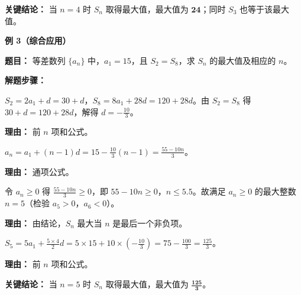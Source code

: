 \begin{examplebox}
	\textbf{\textcolor{CExample}{关键结论：}}
	当 $n=4$ 时 $S_n$ 取得最大值，最大值为 $\boldsymbol{24}$；同时 $S_3$ 也等于该最大值。

	\medskip
	\textbf{\textcolor{CExample}{例 3（综合应用）}}

	\textbf{\textcolor{CExample}{题目：}}
	等差数列 $\{a_n\}$ 中，$a_1=15$，且 $S_2=S_8$，求 $S_n$ 的最大值及相应的 $n$。

	\textbf{\textcolor{CExample}{解题步骤：}}
	\begin{description}[style=nextline, leftmargin=2.8em, labelsep=0.5em, itemsep=0.45em]
		\item[\textbf{第一步（由条件求公差）：}] $S_2=2a_1+d=30+d$，$S_8=8a_1+28d=120+28d$。由 $S_2=S_8$ 得 $30+d=120+28d$，解得 $d=-\frac{10}{3}$。
			\par\textbf{理由：}
			前 $n$ 项和公式。
		\item[\textbf{第二步（求通项）：}] $a_n = a_1+(n-1)d = 15 - \frac{10}{3}(n-1) = \frac{55-10n}{3}$。
			\par\textbf{理由：}
			通项公式。
		\item[\textbf{第三步（确定 $n$）：}] 令 $a_n\ge 0$ 得 $\frac{55-10n}{3}\ge 0$，即 $55-10n\ge 0$，$n\le 5.5$。故满足 $a_n\ge 0$ 的最大整数 $n=5$（检验 $a_5>0$，$a_6<0$）。
			\par\textbf{理由：}
			由结论，$S_n$ 最大当 $n$ 是最后一个非负项。
		\item[\textbf{第四步（求最大值）：}] $S_5 = 5a_1 + \frac{5\times 4}{2}d = 5\times 15 + 10\times \left(-\frac{10}{3}\right) = 75 - \frac{100}{3} = \frac{125}{3}$。
			\par\textbf{理由：}
			前 $n$ 项和公式。
	\end{description}

	\textbf{\textcolor{CExample}{关键结论：}}
	当 $n=5$ 时 $S_n$ 取得最大值，最大值为 $\boldsymbol{\frac{125}{3}}$。

\end{examplebox}
